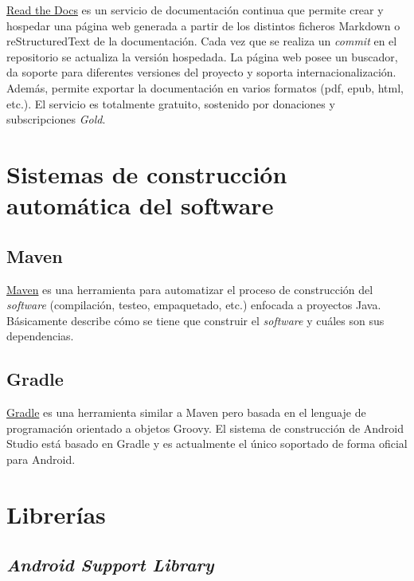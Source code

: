 \href{https://readthedocs.org/}{Read the Docs} es un servicio de documentación continua que permite crear
y hospedar una página web generada a partir de los distintos ficheros
Markdown o reStructuredText de la documentación. Cada vez que se realiza
un \emph{commit} en el repositorio se actualiza la versión hospedada. La
página web posee un buscador, da soporte para diferentes versiones del
proyecto y soporta internacionalización. Además, permite exportar la
documentación en varios formatos (pdf, epub, html, etc.). El servicio es
totalmente gratuito, sostenido por donaciones y subscripciones
\emph{Gold}.

\section{Sistemas de construcción automática del
software}\label{sistemas-de-construccion-automuxe1tica-del-software}

\subsection{Maven}\label{maven}

\href{https://maven.apache.org/}{Maven} es una herramienta para
automatizar el proceso de construcción del \emph{software} (compilación,
testeo, empaquetado, etc.) enfocada a proyectos Java. Básicamente
describe cómo se tiene que construir el \emph{software} y cuáles son sus
dependencias.

\subsection{Gradle}\label{gradle}

\href{https://gradle.org/}{Gradle} es una herramienta similar a Maven
pero basada en el lenguaje de programación orientado a objetos Groovy.
El sistema de construcción de Android Studio está basado en Gradle y es
actualmente el único soportado de forma oficial para Android.

\section{Librerías}\label{libreruxedas}

\subsection{\texorpdfstring{\emph{Android Support
Library}}{Android Support Library}}\label{android-support-library}

